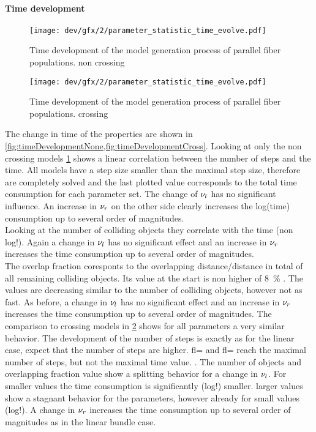 \paragraph{Time development}
% 
\begin{figure}[p]
\centering
\texttt{[image: dev/gfx/2/parameter\_statistic\_time\_evolve.pdf]}
\caption[Time development parallel]{Time development of the model generation process of parallel fiber populations. non crossing}
\label{fig:timeDevelopmentNone}
\end{figure}
% 
\begin{figure}[p]
\centering
\texttt{[image: dev/gfx/2/parameter\_statistic\_time\_evolve.pdf]}
\caption[Time development parallel]{Time development of the model generation process of parallel fiber populations. crossing }
\label{fig:timeDevelopmentCross}
\end{figure}
% 
The change in time of the properties are shown in \cref{fig:timeDevelopmentNone,fig:timeDevelopmentCross}.
Looking at only the non crossing models \cref{fig:timeDevelopmentNone} shows a linear correlation between the number of steps and the time.
All models have a step size smaller than the maximal step size, therefore are completely solved and the last plotted value corresponds to the total time consumption for each parameter set.
The change of $\textnormal{$\nu_{l}$}$ has no significant influence.
An increase in $\textnormal{$\nu_{r}$}$ on the other side clearly increases the log(time) consumption up to several order of magnitudes.
\\
% 
Looking at the number of colliding objects they correlate with the time (non log!). 
Again a change in $\textnormal{$\nu_{l}$}$ has no significant effect and an increase in $\textnormal{$\nu_{r}$}$ increases the time consumption up to several order of magnitudes.
\\
% 
The overlap fraction coresponts to the overlapping distance/distance in total of all remaining colliding objects.
Its value at the start is non higher of \SI{8}{\percent} \dummy{}.
The values are decreasing similar to the number of colliding objects, however not as fast.
As before, a change in $\textnormal{$\nu_{l}$}$ has no significant effect and an increase in $\textnormal{$\nu_{r}$}$ increases the time consumption up to several order of magnitudes.
% 
The comparison to crossing models in \cref{fig:timeDevelopmentCross} shows for all parameters a very similar behavior.
The development of the number of steps is exactly as for the linear case, expect that the number of steps are higher.
fl=\dummy{} and fl= \dummy{} reach the maximal number of steps, but not the maximal time value.
.
The number of objects and overlapping fraction value show a splitting behavior for a change in $\textnormal{$\nu_{l}$}$.
For smaller values the time consumption is significantly (log!) smaller.
larger values show a stagnant behavior for the parameters, however already for small values (log!).
A change in $\textnormal{$\nu_{r}$}$  increases the time consumption up to several order of magnitudes as in the linear bundle case.
% 
% 
% 
